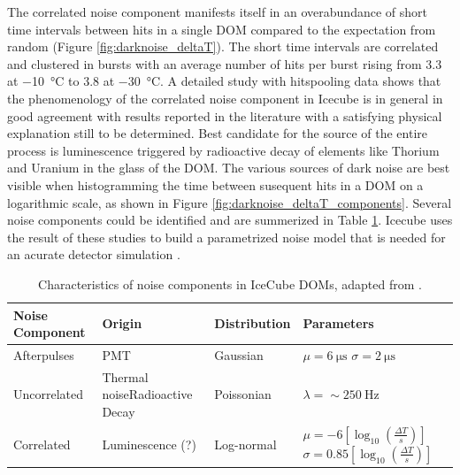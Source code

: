 The correlated noise component manifests itself in an overabundance of short time intervals between hits in a single DOM compared to the expectation from random (Figure \ref{fig:darknoise_deltaT}). The short time intervals are correlated and clustered in bursts with an average number of hits per burst rising from \num{3.3} at \SI{-10}{\celsius} to \num{3.8} at \SI{-30}{\celsius}. A detailed study with hitspooling data shows that the phenomenology of the correlated noise component in Icecube is in general in good agreement with results reported in the literature with a satisfying physical explanation still to be determined. Best candidate for the source of the entire process is luminescence triggered by radioactive decay of elements like Thorium and Uranium in the glass of the DOM.
The various sources of dark noise are best visible when histogramming the time between susequent hits in a DOM on a logarithmic scale, as shown in Figure \ref{fig:darknoise_deltaT_components}. Several noise components could be identified and are summerized in Table \ref{tab:noise}.
Icecube uses the result of these studies to build a parametrized noise model that is needed for an acurate detector simulation \cite{larson2013simulation}.

\begin{table}[h!]
\caption{Characteristics of noise components in IceCube DOMs, adapted from \cite{stanisha_noise_14}.}
  \centering
  \footnotesize
\begin{tabularx}{\textwidth}{lXXX}
\toprule
Noise Component& Origin & Distribution & Parameters \\
\midrule
Afterpulses & PMT & Gaussian & $\mu = \SI{6}{\micro\second}$ \newline $\sigma = \SI{2}{\micro\second}$\\
Uncorrelated & Thermal noise\newline Radioactive Decay & Poissonian & $\lambda = \sim \SI{250}{\hertz}$\\
Correlated & Luminescence (?) & Log-normal & $\mu = \num{-6} [\log_{10}(\frac{\Delta T}{s})]$ \newline $\sigma = \num{0.85} [\log_{10}(\frac{\Delta T}{s})]$\\
\bottomrule
\end{tabularx}
\label{tab:noise}
\end{table}

